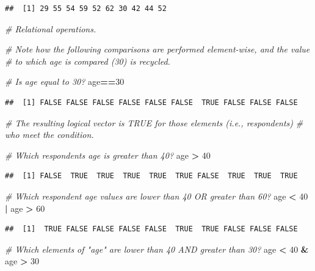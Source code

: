 \documentclass[
]{book}
\newenvironment{Shaded}{\begin{snugshade}}{\end{snugshade}}
\newcommand{\CommentTok}[1]{\textcolor[rgb]{0.56,0.35,0.01}{\textit{#1}}}
\newcommand{\DecValTok}[1]{\textcolor[rgb]{0.00,0.00,0.81}{#1}}
\newcommand{\NormalTok}[1]{#1}
\newcommand{\SpecialCharTok}[1]{\textcolor[rgb]{0.81,0.36,0.00}{\textbf{#1}}}
\begin{document}
\begin{verbatim}
##  [1] 29 55 54 59 52 62 30 42 44 52
\end{verbatim}

\begin{Shaded}
\begin{Highlighting}[]
\CommentTok{\# Relational operations.}

\CommentTok{\# Note how the following comparisons are performed element{-}wise, and the value}
\CommentTok{\# to which age is compared (30) is recycled.}

\CommentTok{\# Is age equal to 30?}
\NormalTok{age}\SpecialCharTok{==}\DecValTok{30}
\end{Highlighting}
\end{Shaded}

\begin{verbatim}
##  [1] FALSE FALSE FALSE FALSE FALSE FALSE  TRUE FALSE FALSE FALSE
\end{verbatim}

\begin{Shaded}
\begin{Highlighting}[]
\CommentTok{\# The resulting logical vector is TRUE for those elements (i.e., respondents)}
\CommentTok{\# who meet the condition.}

\CommentTok{\# Which respondent\textquotesingle{}s age is greater than 40?}
\NormalTok{age }\SpecialCharTok{\textgreater{}} \DecValTok{40}
\end{Highlighting}
\end{Shaded}

\begin{verbatim}
##  [1] FALSE  TRUE  TRUE  TRUE  TRUE  TRUE FALSE  TRUE  TRUE  TRUE
\end{verbatim}

\begin{Shaded}
\begin{Highlighting}[]
\CommentTok{\# Which respondent age values are lower than 40 OR greater than 60?}
\NormalTok{age }\SpecialCharTok{\textless{}} \DecValTok{40} \SpecialCharTok{|}\NormalTok{ age }\SpecialCharTok{\textgreater{}} \DecValTok{60}
\end{Highlighting}
\end{Shaded}

\begin{verbatim}
##  [1]  TRUE FALSE FALSE FALSE FALSE  TRUE  TRUE FALSE FALSE FALSE
\end{verbatim}

\begin{Shaded}
\begin{Highlighting}[]
\CommentTok{\# Which elements of "age" are lower than 40 AND greater than 30?}
\NormalTok{age }\SpecialCharTok{\textless{}} \DecValTok{40} \SpecialCharTok{\&}\NormalTok{ age }\SpecialCharTok{\textgreater{}} \DecValTok{30}
\end{Highlighting}
\end{Shaded}
\end{document}
